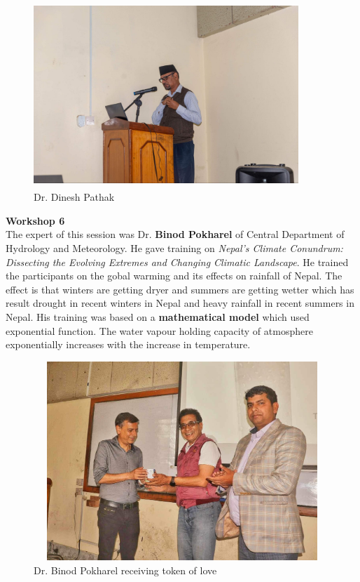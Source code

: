 \documentclass[a4paper,12pt]{report}
\begin{document}
\vspace{4mm}
\begin{figure}[h!]
  \centering
  \includegraphics[width=10cm, height=7cm]{pathak.jpeg}
  \caption{Dr. Dinesh Pathak}
\end{figure}
\clearpage

{\bfseries \large Workshop 6}\\[3mm]
The expert of this session was Dr. \textbf{Binod Pokharel} of Central Department of Hydrology and Meteorology. He gave training on \textit{Nepal's Climate Conundrum: Dissecting the Evolving Extremes and Changing Climatic Landscape}. He trained the participants on the gobal warming and its effects on rainfall of Nepal. The effect is that winters are getting dryer and summers are getting wetter which has result drought in recent winters in Nepal and heavy rainfall in recent summers in Nepal. His training was based on a \textbf{mathematical model} which used exponential function. The water vapour holding capacity of atmosphere exponentially increases with the increase in temperature.
\vspace{5mm}

\begin{figure}[h!]
  \centering
  \includegraphics[width=12cm, height=7.5cm]{binod.jpeg}
  \caption{Dr. Binod Pokharel receiving token of love}
\end{figure}
\end{document}
